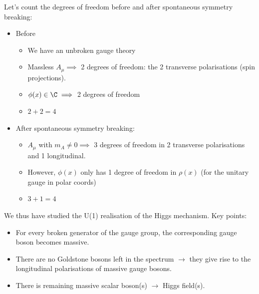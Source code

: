 \documentclass[relqm.tex]{subfiles}
\begin{document}
Let's count the degrees of freedom before and after spontaneous symmetry breaking:
\begin{itemize}
    \item Before
        \begin{itemize}
            \item We have an unbroken gauge theory
            \item Massless $A_\mu\implies$ 2 degrees of freedom: the 2 transverse polarisations (spin projections).
            \item $\phi(x)\in\C\implies$ 2 degrees of freedom
            \item $2+2=4$
        \end{itemize}
    \item After spontaneous symmetry breaking:
        \begin{itemize}
            \item $A_\mu$ with $m_A\neq0\implies$ 3 degrees of freedom in 2 transverse polarisations and 1 longitudinal. 
            \item However, $\phi(x)$ only has 1 degree of freedom in $\rho(x)$ (for the unitary gauge in polar coords)
            \item $3+1=4$
        \end{itemize}
\end{itemize}
We thus have studied the U(1) realisation of the Higgs mechanism. 
Key points:
\begin{itemize}
    \item For every broken generator of the gauge group, the corresponding gauge boson becomes massive. 
    \item There are no Goldstone bosons left in the spectrum $\to$ they give rise to the longitudinal polarisations of massive gauge bosons. 
    \item There is remaining massive scalar boson(s) $\to$ Higgs field(s).
\end{itemize}
\end{document}
